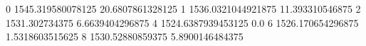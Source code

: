 0 1545.319580078125 20.6807861328125
1 1536.0321044921875 11.393310546875
2 1531.302734375 6.6639404296875
4 1524.6387939453125 0.0
6 1526.170654296875 1.5318603515625
8 1530.52880859375 5.8900146484375
